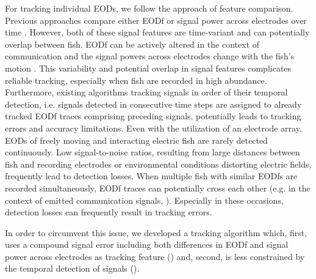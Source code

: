 For tracking individual EODs, we follow the approach of feature comparison. Previous approaches compare either EODf or signal power across electrodes over time \citep{Madhav2018, Henninger2020}. However, both of these signal features are time-variant and can potentially overlap between fish. EODf can be actively altered in the context of communication \citep{Smith2013} and the signal powers across electrodes change with the fish's motion \citep{Madhav2018}. This variability and potential overlap in signal features complicates reliable tracking, especially when fish are recorded in high abundance. Furthermore, existing algorithms tracking signals in order of their temporal detection, i.e. signals detected in consecutive time steps are assigned to already tracked EODf traces comprising preceding signals, potentially leads to tracking errors and accuracy limitations. Even with the utilization of an electrode array, EODs of freely moving and interacting electric fish are rarely detected continuously. Low signal-to-noise ratios, resulting from large distances between fish and recording electrodes or environmental conditions distorting electric fields, frequently lead to detection losses. When multiple fish with similar EODfs are recorded simultaneously, EODf traces can potentially cross each other (e.g. in the context of emitted communication signals, \citealp{Smith2013}). Especially in these occasions, detection losses can frequently result in tracking errors. 

In order to circumvent this issue, we developed a tracking algorithm which, first, uses a compound signal error including both differences in EODf and signal power across electrodes as tracking feature () and, second, is less constrained by the temporal detection of signals (). 

